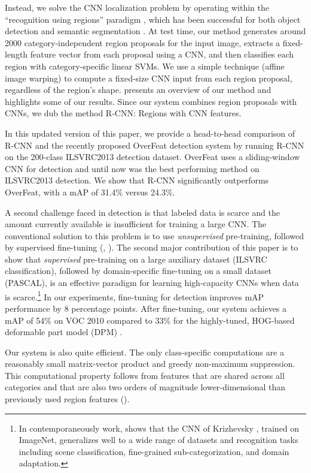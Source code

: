 Instead, we solve the CNN localization problem by operating within the ``recognition using regions'' paradigm \cite{gu2009recognition}, which has been successful for both object detection \cite{UijlingsIJCV2013} and semantic segmentation \cite{carreira2012cpmc}.
At test time, our method generates around 2000 category-independent region proposals for the input image, extracts a fixed-length feature vector from each proposal using a CNN, and then classifies each region with category-specific linear SVMs.
We use a simple technique (affine image warping) to compute a fixed-size CNN input from each region proposal, regardless of the region's shape.
 presents an overview of our method and highlights some of our results.
Since our system combines region proposals with CNNs, we dub the method R-CNN: Regions with CNN features.

In this updated version of this paper, we provide a head-to-head comparison of R-CNN and the recently proposed OverFeat \cite{overfeat} detection system by running R-CNN on the 200-class ILSVRC2013 detection dataset.
OverFeat uses a sliding-window CNN for detection and until now was the best performing method on ILSVRC2013 detection.
We show that R-CNN significantly outperforms OverFeat, with a mAP of 31.4\% versus 24.3\%.

A second challenge faced in detection is that labeled data is scarce and the amount currently available is insufficient for training a large CNN.
The conventional solution to this problem is to use \emph{unsupervised} pre-training, followed by supervised fine-tuning (\eg, \cite{sermanetCVPR13}).
The second major contribution of this paper is to show that \emph{supervised} pre-training on a large auxiliary dataset (ILSVRC classification), followed by domain-specific fine-tuning on a small dataset (PASCAL), is an effective paradigm for learning high-capacity CNNs when data is scarce.\footnote{In contemporaneously work, \cite{decafICML} shows that the CNN of Krizhevsky \etal, trained on ImageNet, generalizes well to a wide range of datasets and recognition tasks including scene classification, fine-grained sub-categorization, and domain adaptation.}
In our experiments, fine-tuning for detection improves mAP performance by 8 percentage points.
After fine-tuning, our system achieves a mAP of 54\% on VOC 2010 compared to 33\% for the highly-tuned, HOG-based deformable part model (DPM) \cite{lsvm-pami,release5}.

Our system is also quite efficient.
The only class-specific computations are a reasonably small matrix-vector product and greedy non-maximum suppression.
This computational property follows from features that are shared across all categories and that are also two orders of magnitude lower-dimensional than previously used region features (\cf \cite{UijlingsIJCV2013}).

